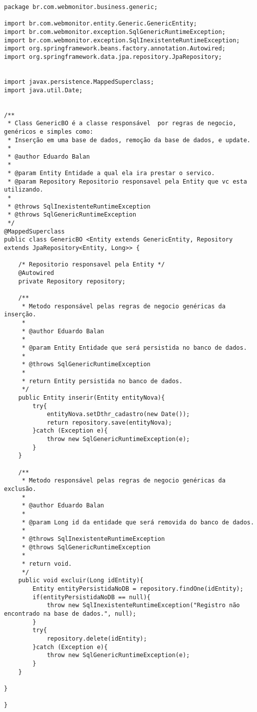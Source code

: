 \begin{lstlisting}[style=Java, label=Func:GenericBO,caption={[Entidade genérica GenericBO.]Entidade genérica GenericBO e suas funcionalidades.}]
package br.com.webmonitor.business.generic;

import br.com.webmonitor.entity.Generic.GenericEntity;
import br.com.webmonitor.exception.SqlGenericRuntimeException;
import br.com.webmonitor.exception.SqlInexistenteRuntimeException;
import org.springframework.beans.factory.annotation.Autowired;
import org.springframework.data.jpa.repository.JpaRepository;


import javax.persistence.MappedSuperclass;
import java.util.Date;


/**
 * Class GenericBO é a classe responsável  por regras de negocio, genéricos e simples como:
 * Inserção em uma base de dados, remoção da base de dados, e update.
 *
 * @author Eduardo Balan
 *
 * @param Entity Entidade a qual ela ira prestar o servico.
 * @param Repository Repositorio responsavel pela Entity que vc esta utilizando.
 *
 * @throws SqlInexistenteRuntimeException
 * @throws SqlGenericRuntimeException
 */
@MappedSuperclass
public class GenericBO <Entity extends GenericEntity, Repository extends JpaRepository<Entity, Long>> {

    /* Repositorio responsavel pela Entity */
    @Autowired
    private Repository repository;

    /**
     * Metodo responsável pelas regras de negocio genéricas da inserção.
     *
     * @author Eduardo Balan
     *
     * @param Entity Entidade que será persistida no banco de dados.
     *
     * @throws SqlGenericRuntimeException
     *
     * return Entity persistida no banco de dados.
     */
    public Entity inserir(Entity entityNova){
        try{
            entityNova.setDthr_cadastro(new Date());
            return repository.save(entityNova);
        }catch (Exception e){
            throw new SqlGenericRuntimeException(e);
        }
    }

    /**
     * Metodo responsável pelas regras de negocio genéricas da exclusão.
     *
     * @author Eduardo Balan
     *
     * @param Long id da entidade que será removida do banco de dados.
     *
     * @throws SqlInexistenteRuntimeException
     * @throws SqlGenericRuntimeException
     *
     * return void.
     */
    public void excluir(Long idEntity){
        Entity entityPersistidaNoDB = repository.findOne(idEntity);
        if(entityPersistidaNoDB == null){
            throw new SqlInexistenteRuntimeException("Registro não encontrado na base de dados.", null);
        }
        try{
            repository.delete(idEntity);
        }catch (Exception e){
            throw new SqlGenericRuntimeException(e);
        }
    }

}

}
\end{lstlisting}

%
